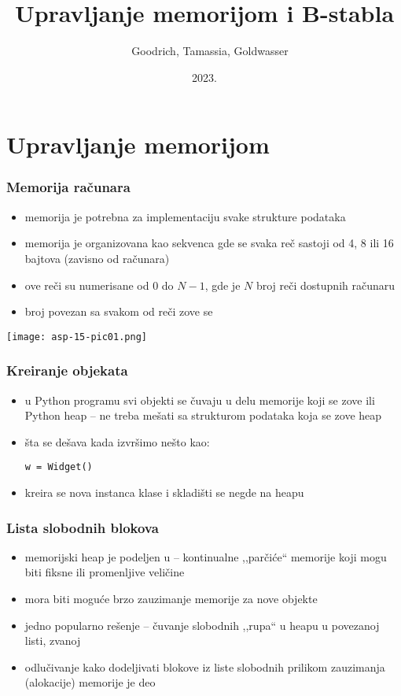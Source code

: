 \documentclass[compress,aspectratio=169]{beamer}
\title{Upravljanje memorijom i B-stabla}
\author{\textcopyright \ \ Goodrich, Tamassia, Goldwasser}
\institute{Katedra za informatiku, Fakultet tehničkih nauka, Univerzitet u
Novom Sadu}
\date{2023.}
\begin{document}
\frame{\titlepage}

\section[Memorija]{Upravljanje memorijom}

\begin{frame}[fragile]
  \frametitle{Memorija računara}
  \begin{itemize}
    \item memorija je potrebna za implementaciju svake strukture podataka
    \item memorija je organizovana kao sekvenca  gde se svaka
    reč sastoji od 4, 8 ili 16 bajtova (zavisno od računara)
    \item ove reči su numerisane od $0$ do $N-1$, gde je $N$ broj reči
    dostupnih računaru
    \item broj povezan sa svakom od reči zove se 
  \end{itemize}
  \begin{center}
    \texttt{[image: asp-15-pic01.png]}
  \end{center}
\end{frame}

\begin{frame}[fragile]
  \frametitle{Kreiranje objekata}
  \begin{itemize}
    \item u Python programu svi objekti se čuvaju u delu memorije koji 
    se zove  ili Python heap -- ne treba mešati sa 
    strukturom podataka koja se zove heap
    \item šta se dešava kada izvršimo nešto kao:
\begin{verbatim}
w = Widget()
\end{verbatim}
    \item kreira se nova instanca klase i skladišti se negde na heapu
  \end{itemize}
\end{frame}

\begin{frame}[fragile]
  \frametitle{Lista slobodnih blokova}
  \begin{itemize}
    \item memorijski heap je podeljen u  -- kontinualne 
    ,,parčiće`` memorije koji mogu biti fiksne ili promenljive veličine
    \item mora biti moguće brzo zauzimanje memorije za nove objekte
    \item jedno popularno rešenje -- čuvanje slobodnih ,,rupa`` u heapu
    u povezanoj listi, zvanoj 
    \item odlučivanje kako dodeljivati blokove iz liste slobodnih 
    prilikom zauzimanja (alokacije) memorije je deo 
  \end{itemize}
\end{frame}
\end{document}
